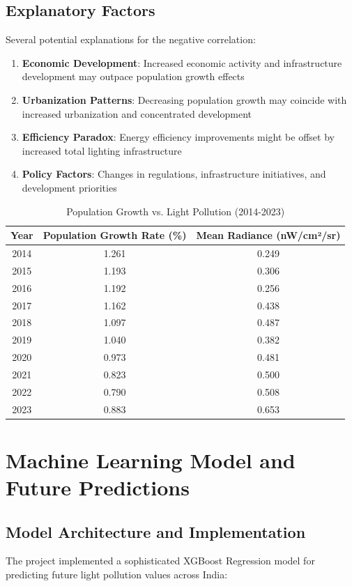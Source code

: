 \documentclass[12pt,a4paper]{article}
\begin{document}
\subsection{Explanatory Factors}
Several potential explanations for the negative correlation:

\begin{enumerate}
    \item \textbf{Economic Development}: Increased economic activity and infrastructure development may outpace population growth effects
    \item \textbf{Urbanization Patterns}: Decreasing population growth may coincide with increased urbanization and concentrated development
    \item \textbf{Efficiency Paradox}: Energy efficiency improvements might be offset by increased total lighting infrastructure
    \item \textbf{Policy Factors}: Changes in regulations, infrastructure initiatives, and development priorities
\end{enumerate}

\begin{table}[h]
\centering
\caption{Population Growth vs. Light Pollution (2014-2023)}
\begin{tabular}{@{}ccc@{}}
\toprule
\textbf{Year} & \textbf{Population Growth Rate (\%)} & \textbf{Mean Radiance (nW/cm²/sr)} \\ \midrule
2014 & 1.261 & 0.249 \\
2015 & 1.193 & 0.306 \\
2016 & 1.192 & 0.256 \\
2017 & 1.162 & 0.438 \\
2018 & 1.097 & 0.487 \\
2019 & 1.040 & 0.382 \\
2020 & 0.973 & 0.481 \\
2021 & 0.823 & 0.500 \\
2022 & 0.790 & 0.508 \\
2023 & 0.883 & 0.653 \\ \bottomrule
\end{tabular}
\end{table}

\section{Machine Learning Model and Future Predictions}

\subsection{Model Architecture and Implementation}
The project implemented a sophisticated XGBoost Regression model for predicting future light pollution values across India:
\end{document}
